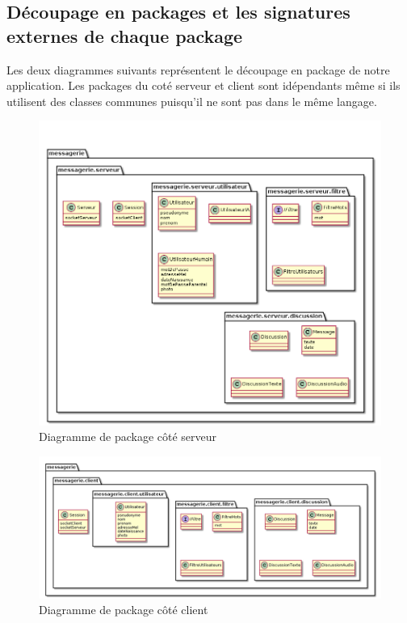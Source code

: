 	\subsection{Découpage en packages et les signatures externes de chaque package}
	Les deux diagrammes suivants représentent le découpage en package de notre application.
	Les packages du coté serveur et client sont idépendants même si ils utilisent des classes communes puisqu'il ne sont pas dans le même langage.
	\begin{figure}[H]
		\centerline{\includegraphics[width=16.5cm]{img/packageServeur.png}}
		\caption{Diagramme de package côté serveur}
	\end{figure}

	\begin{figure}[H]
		\centerline{\includegraphics[width=16.5cm]{img/packageClient.png}}
		\caption{Diagramme de package côté client}
	\end{figure}